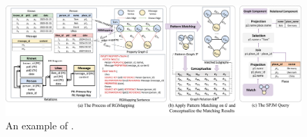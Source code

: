 \begin{figure}
    \centering
    \includegraphics[width=\linewidth]{./figures/rgmapping.pdf}
    \vspace*{-2mm}
    \caption{An example of \rgmapping.}
    \vspace*{-1mm}
    \label{fig:intro-rgmapping-example}
\end{figure}

